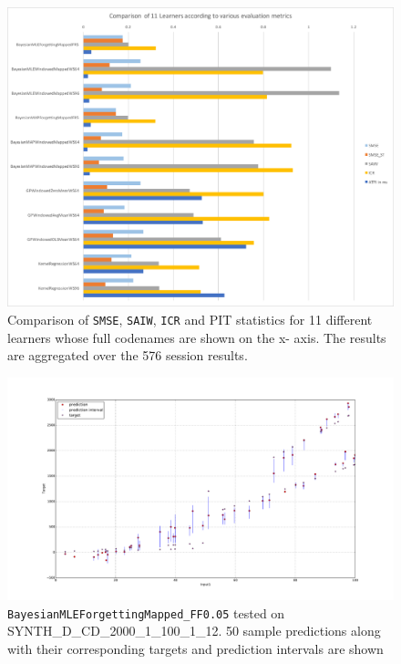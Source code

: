 \begin{figure}[htbp]
  \centering
    \includegraphics[width=\linewidth]{./Figures/final_11_comparison.pdf}
  \caption{Comparison of \texttt{SMSE}, \texttt{SAIW}, \texttt{ICR} and PIT statistics for 11 different learners whose full codenames are shown on the x- axis. The results are aggregated over the 576 session results.}
  \label{fig:final_11_comparison}
\end{figure}

\begin{figure}[htbp]
  \centering
    \includegraphics[width=\linewidth]{./Figures/sampled_50_predictions_bmle_mapped_fr5_SYNTH_D_CD_2000_1_100_1_12.pdf}
  \caption{\texttt{BayesianMLEForgettingMapped\_FF0.05} tested on SYNTH\_D\_CD\_2000\_1\_100\_1\_12. 50 sample predictions along with their corresponding targets and prediction intervals are shown}
 \label{fig:sampled_50_predictions_bmle_mapped_fr5_SYNTH_D_CD_2000_1_100_1_12}
\end{figure}

